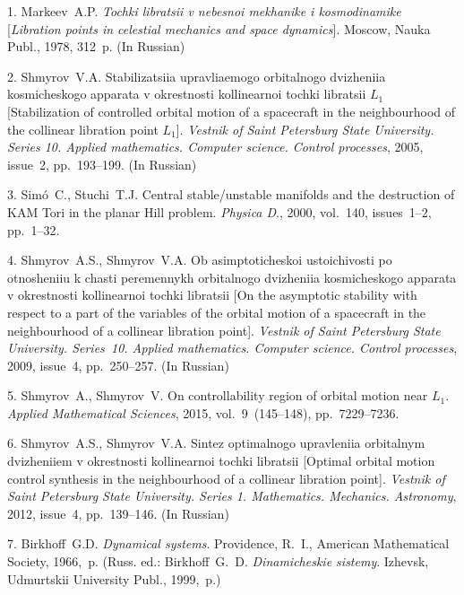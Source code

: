 

{\footnotesize

\vskip 4mm


\vskip 3mm



1. Markeev~A.\:P. \emph{Tochki libratsii v nebesnoi mekhanike i
kosmodinamike} [\emph{Libration points in celestial mechanics and
space dynamics}]. Moscow, Nauka Publ., 1978, 312~p. (In Russian)

2. Shmyrov~V.\:A. Stabilizatsiia upravliaemogo orbitalnogo
dvizheniia kosmicheskogo apparata v okrestnosti kollinearnoi
tochki libratsii $L_1$ [Stabilization of controlled orbital motion
of a spacecraft in the neighbourhood of the collinear libration
point $L_1$]. \emph{Vestnik of Saint Petersburg State University.
Series 10. Applied mathematics. Computer science. Control
processes}, 2005, issue~2, pp.~193--199. (In Russian)

3. Sim\'o~C., Stuchi~T.\:J. Central stable/unstable manifolds and
the destruction of KAM Tori in the planar Hill problem. {\it
Physica D}., 2000, vol.~140, issues~1--2, pp.~1--32.

4. Shmyrov~A.\:S., Shmyrov~V.\:A. Ob asimptoticheskoi
ustoichivosti po otnosheniiu k chasti peremennykh orbitalnogo
dvizheniia     kosmicheskogo apparata v okrestnosti kollinearnoi
tochki libratsii [On the asymptotic stability with respect to a
part of the      variables of the orbital motion of a spacecraft
in the neighbourhood of a collinear libration point].
\emph{Vestnik of Saint Petersburg State University. Series~10.
Applied mathematics. Computer science. Control processes}, 2009,
issue~4, pp.~250--257. (In Russian)

5. Shmyrov~A., Shmyrov~V. On controllability region of orbital
motion near $L_1$. \emph{Applied Mathematical Sciences}, 2015,
vol.~9~(145--148), pp.~7229--7236.

6. Shmyrov~A.\:S., Shmyrov~V.\:A. Sintez optimalnogo upravleniia
orbitalnym dvizheniiem v okrestnosti kollinearnoi tochki libratsii
[Optimal orbital motion control synthesis in the neighbourhood of
a collinear libration point]. \emph{Vestnik of Saint Petersburg
State University. Series 1. Mathematics. Mechanics. Astronomy},
2012, issue~4, pp.~139--146. (In Russian)

7. Birkhoff~G.\:D. \emph{Dynamical systems}. Providence, R.~I.,
American Mathematical Society, 1966,~p. (Russ. ed.:
Birkhoff~G.~D. \emph{Dinamicheskie sistemy}. Izhevsk, Udmurtskii
University Publ., 1999,~p.)\newpage

}

